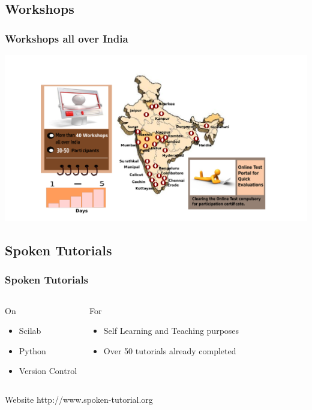 \documentclass[compress,red]{beamer} %
\begin{document}
\subsection{Workshops}
\begin{frame}
\frametitle{Workshops all over India}
\includegraphics[scale=.15]{workshop.png}
\end{frame}

\subsection{Spoken Tutorials}
\begin{frame}
\frametitle{Spoken Tutorials}
\begin{columns}
\begin{block}{On}
\begin{itemize}
\item Scilab \pause
\item Python \pause
\item Version Control \pause
\end{itemize}
\end{block}
\begin{block}{For}
\begin{itemize}
\item Self Learning and Teaching purposes \pause
\item Over \alert{50} tutorials already completed  
\end{itemize}
\end{block}
\pause
\end{columns}
\begin{block}{Website}
http://www.spoken-tutorial.org
\end{block}
\end{frame}
\end{document}
